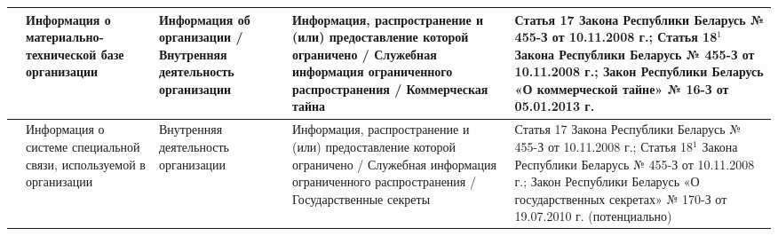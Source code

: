 \documentclass{bsuir}
\begin{document}
{\begin{longtable}{|>{\centering\arraybackslash}m{}|>{\arraybackslash}m{}|>{\arraybackslash}m{}|>{\arraybackslash}m{}|>{\arraybackslash}m{}|}
\hline
22 & Информация о материально-технической базе организации & Информация об организации / Внутренняя деятельность организации & Информация, распространение и (или) предоставление которой ограничено / Служебная информация ограниченного распространения / Коммерческая тайна & Статья 17 Закона Республики Беларусь № 455-З от 10.11.2008 г.; Статья 18$^1$ Закона Республики Беларусь № 455-З от 10.11.2008 г.; Закон Республики Беларусь «О коммерческой тайне» № 16-З от 05.01.2013 г. \\
\hline
23 & Информация о системе специальной связи, используемой в организации & Внутренняя деятельность организации & Информация, распространение и (или) предоставление которой ограничено / Служебная информация ограниченного распространения / Государственные секреты & Статья 17 Закона Республики Беларусь № 455-З от 10.11.2008 г.; Статья 18$^1$ Закона Республики Беларусь № 455-З от 10.11.2008 г.; Закон Республики Беларусь «О государственных секретах» № 170-З от 19.07.2010 г. (потенциально) \\
\hline

\end{longtable}}
\end{document}
